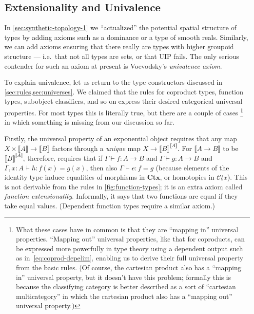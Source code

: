 \documentclass[10pt]{article}
\def\m#1{\llbracket#1\rrbracket}
\def\types{\vdash}
\def\Ctx{\mathbf{Ctx}}
\def\cCtx{\underline{\mathscr{C}\!\mathit{tx}}}
\numberwithin{equation}{section}
\begin{document}
\subsection{Extensionality and Univalence}
\label{sec:voev-univ-axiom}

In \cref{sec:synthetic-topology-1} we ``actualized'' the potential spatial structure of types by adding axioms such as a dominance or a type of smooth reals.
Similarly, we can add axioms ensuring that there really are types with higher groupoid structure --- i.e.\ that not all types are sets, or that UIP fails.
The only serious contender for such an axiom at present is Voevodsky's \emph{univalence axiom}. %

To explain univalence, let us return to the type constructors discussed in \cref{sec:rules,sec:universes}.
We claimed that the rules for coproduct types, function types, subobject classifiers, and so on express their desired categorical universal properties.
For most types this is literally true, but there are a couple of cases%
\footnote{What these cases have in common is that they are ``mapping in'' universal properties.
  ``Mapping out'' universal properties, like that for coproducts, can be expressed more powerfully in type theory using a dependent output such as in~\eqref{eq:coprod-depelim}, enabling us to derive their full universal property from the basic rules.
  (Of course, the cartesian product also has a ``mapping in'' universal property, but it doesn't have this problem; formally this is because the classifying category is better described as a sort of ``cartesian multicategory'' in which the cartesian product also has a ``mapping out'' universal property.)}
in which something is missing from our discussion so far.

Firstly, the universal property of an exponential object requires that any map $X\times \m A \to \m B$ factors through a \emph{unique} map $X\to {\m B}^{\m A}$.
For $\m{A\to B}$ to be ${\m B}^{\m A}$, therefore, requires that if $\Gamma\types f:A\to B$ and $\Gamma\types g:A\to B$ and $\Gamma,x:A \types h: f(x)=g(x)$, then also $\Gamma \types e:f=g$ (because elements of the identity type induce equalities of morphisms in $\Ctx$, or homotopies in $\cCtx$).
This is not derivable from the rules in \cref{fig:function-types}; it is an extra axiom called \emph{function extensionality}.
Informally, it says that two functions are equal if they take equal values.
(Dependent function types %
require a similar axiom.)
\end{document}
